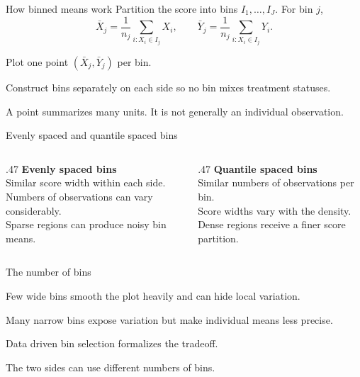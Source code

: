 \begin{frame}{How binned means work}
Partition the score into bins $I_1,\ldots,I_J$. For bin $j$,
\[
\bar X_j=\frac{1}{n_j}\sum_{i:X_i\in I_j}X_i,
\qquad
\bar Y_j=\frac{1}{n_j}\sum_{i:X_i\in I_j}Y_i.
\]
\begin{items}
\item Plot one point $(\bar X_j,\bar Y_j)$ per bin.
\item Construct bins separately on each side so no bin mixes treatment statuses.
\item A point summarizes many units. It is not generally an individual observation.
\end{items}
\end{frame}

\begin{frame}{Evenly spaced and quantile spaced bins}
\begin{columns}[T]
\begin{column}{.47\textwidth}
\textbf{Evenly spaced bins}\\[.5em]
Similar score width within each side.\\[.6em]
Numbers of observations can vary considerably.\\[.6em]
Sparse regions can produce noisy bin means.
\end{column}
\begin{column}{.47\textwidth}
\textbf{Quantile spaced bins}\\[.5em]
Similar numbers of observations per bin.\\[.6em]
Score widths vary with the density.\\[.6em]
Dense regions receive a finer score partition.
\end{column}
\end{columns}
\end{frame}

\begin{frame}{The number of bins}
\begin{items}
\item Few wide bins smooth the plot heavily and can hide local variation.
\item Many narrow bins expose variation but make individual means less precise.
\item Data driven bin selection formalizes the tradeoff.
\item The two sides can use different numbers of bins.
\end{items}
\end{frame}


